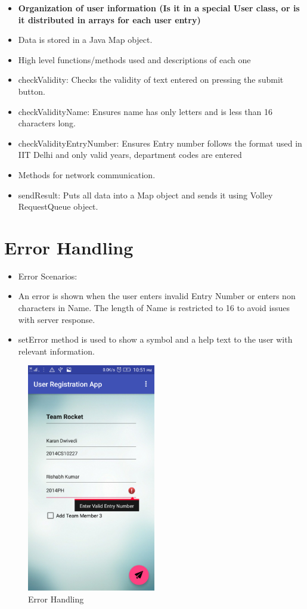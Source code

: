 \documentclass[12pt,a4paper,titlepage]{article}
\begin{document}
\begin{itemize}
	\item \textbf{Organization of user information (Is it in a special User class, or is it distributed in arrays for each user entry)}
	\item[] Data is stored in a Java Map object.
	\item  High	level functions/methods used and descriptions of each one	
	\item [] checkValidity: Checks the validity of text entered on pressing the submit button.
	\item[] checkValidityName: Ensures name has only letters and is less than 16 characters long.
	\item[] checkValidityEntryNumber: Ensures Entry number follows the format used in IIT Delhi and only valid years, department codes are entered
	\item Methods for network communication.
	\item[] sendResult: Puts all data into a Map object and sends it using Volley RequestQueue object.
\end{itemize}


\section{Error Handling}
\label{error}

\begin{itemize}
	        
	\item Error Scenarios:
	\item[] An error is shown when the user enters invalid Entry Number or enters non characters in Name. The length of Name is restricted to 16 to avoid issues with server response.
	\item[] setError method is used to show a symbol and a help text to the user with relevant information.

\end{itemize}

\begin{figure}[!ht]
	\centering
	\includegraphics[width=0.5\textwidth]{./screen_error}
	\caption{Error Handling}
\end{figure}
\end{document}
